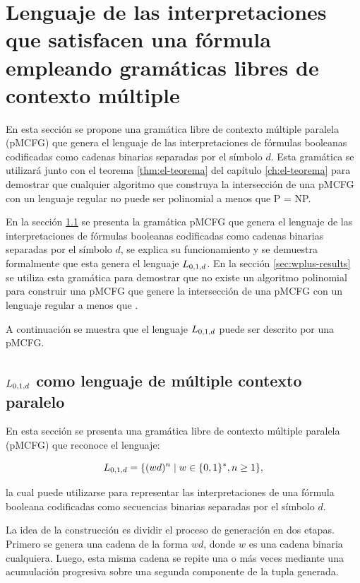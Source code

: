 \chapter{Lenguaje de las interpretaciones que satisfacen una fórmula empleando gramáticas libres de contexto múltiple}
\label{ch:w-plus}

En esta sección se propone una gramática libre de contexto múltiple paralela (pMCFG) que genera el lenguaje de las interpretaciones de fórmulas booleanas codificadas como cadenas binarias separadas por el símbolo $d$. Esta gramática se utilizará junto con el teorema \ref{thm:el-teorema} del capítulo \ref{ch:el-teorema} para demostrar que cualquier algoritmo que construya la intersección de una pMCFG con un lenguaje regular no puede ser polinomial a menos que P = NP.

En la sección \ref{sec:repeatlang-pmcfg} se presenta la gramática pMCFG que genera el lenguaje de las interpretaciones de fórmulas booleanas codificadas como cadenas binarias separadas por el símbolo $d$, se explica su funcionamiento y se demuestra formalmente que esta genera el lenguaje $L_{0,1,d}$. En la sección \ref{sec:wplus-results} se utiliza esta gramática para demostrar que no existe un algoritmo polinomial para construir una pMCFG que genere la intersección de una pMCFG con un lenguaje regular a menos que \pnp.

A continuación se muestra que el lenguaje $L_{0,1,d}$ puede ser descrito por una pMCFG.

\section{$L_{0,1,d}$ como lenguaje de múltiple contexto paralelo}
\label{sec:repeatlang-pmcfg}

En esta sección se presenta una gramática libre de contexto múltiple paralela (pMCFG) que reconoce el lenguaje:

$$
    L_{0,1,d} = \{(wd)^n \;|\; w \in \{0, 1\}^*, n \geq 1 \},
$$

la cual puede utilizarse para representar las interpretaciones de una fórmula booleana codificadas como secuencias binarias separadas por el símbolo $d$.

La idea de la construcción es dividir el proceso de generación en dos etapas. Primero se genera una cadena de la forma $wd$, donde $w$ es una cadena binaria cualquiera. Luego, esta misma cadena se repite una o más veces mediante una acumulación progresiva sobre una segunda componente de la tupla generada.

